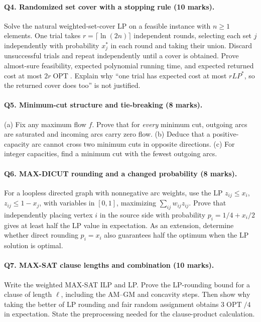 \documentclass[10pt]{article}
\theoremstyle{definition}
\newcommand{\OPT}{\operatorname{OPT}}
\begin{document}
\paragraph{Q4. Randomized set cover with a stopping rule (10 marks).}
Solve the natural weighted-set-cover LP on a feasible instance with $n\ge1$
elements.  One trial takes $r=\lceil\ln(2n)\rceil$ independent rounds,
selecting each set $j$ independently with probability $x_j^*$ in each round
and taking their union.  Discard unsuccessful trials and repeat independently
until a cover is obtained.  Prove almost-sure feasibility, expected polynomial
running time, and expected returned cost at most $2r\OPT$.  Explain why
``one trial has expected cost at most $rLP^*$, so the returned cover does
too'' is not justified.

\paragraph{Q5. Minimum-cut structure and tie-breaking (8 marks).}
(a) Fix any maximum flow $f$.  Prove that for \emph{every} minimum cut,
outgoing arcs are saturated and incoming arcs carry zero flow.
(b) Deduce that a positive-capacity arc cannot cross two minimum cuts in
opposite directions.  (c) For integer capacities, find a minimum cut with
the fewest outgoing arcs.

\paragraph{Q6. MAX-DICUT rounding and a changed probability (8 marks).}
For a loopless directed graph with nonnegative arc weights, use the LP
$z_{ij}\le x_i$, $z_{ij}\le1-x_j$, with variables in $[0,1]$, maximizing
$\sum_{ij}w_{ij}z_{ij}$.  Prove that independently placing vertex $i$ in
the source side with probability $p_i=1/4+x_i/2$ gives at least half the
LP value in expectation.  As an extension, determine whether direct
rounding $p_i=x_i$ also guarantees half the optimum when the LP solution
is optimal.

\paragraph{Q7. MAX-SAT clause lengths and combination (10 marks).}
Write the weighted MAX-SAT ILP and LP.  Prove the LP-rounding bound for a
clause of length $\ell$, including the AM--GM and concavity steps.  Then
show why taking the better of LP rounding and fair random assignment
obtains $3\OPT/4$ in expectation.  State the preprocessing needed for
the clause-product calculation.
\end{document}
